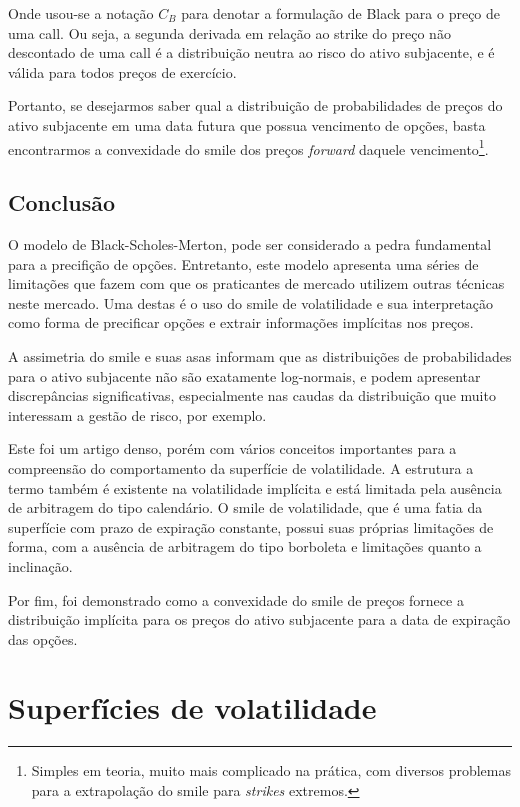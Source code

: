 \documentclass[]{book}
\let\rmarkdownfootnote\footnote%
\def\footnote{\protect\rmarkdownfootnote}
\theoremstyle{definition}
\theoremstyle{definition}
\theoremstyle{definition}
\theoremstyle{remark}
\begin{document}
Onde usou-se a notação \(C_B\) para denotar a formulação de Black para o
preço de uma call. Ou seja, a segunda derivada em relação ao strike do
preço não descontado de uma call é a distribuição neutra ao risco do
ativo subjacente, e é válida para todos preços de exercício.

Portanto, se desejarmos saber qual a distribuição de probabilidades de
preços do ativo subjacente em uma data futura que possua vencimento de
opções, basta encontrarmos a convexidade do smile dos preços
\emph{forward} daquele vencimento\footnote{Simples em teoria, muito mais
  complicado na prática, com diversos problemas para a extrapolação do
  smile para \emph{strikes} extremos.}.

\section{Conclusão}\label{conclusao}

O modelo de Black-Scholes-Merton, pode ser considerado a pedra
fundamental para a precifição de opções. Entretanto, este modelo
apresenta uma séries de limitações que fazem com que os praticantes de
mercado utilizem outras técnicas neste mercado. Uma destas é o uso do
smile de volatilidade e sua interpretação como forma de precificar
opções e extrair informações implícitas nos preços.

A assimetria do smile e suas asas informam que as distribuições de
probabilidades para o ativo subjacente não são exatamente log-normais, e
podem apresentar discrepâncias significativas, especialmente nas caudas
da distribuição que muito interessam a gestão de risco, por exemplo.

Este foi um artigo denso, porém com vários conceitos importantes para a
compreensão do comportamento da superfície de volatilidade. A estrutura
a termo também é existente na volatilidade implícita e está limitada
pela ausência de arbitragem do tipo calendário. O smile de volatilidade,
que é uma fatia da superfície com prazo de expiração constante, possui
suas próprias limitações de forma, com a ausência de arbitragem do tipo
borboleta e limitações quanto a inclinação.

Por fim, foi demonstrado como a convexidade do smile de preços fornece a
distribuição implícita para os preços do ativo subjacente para a data de
expiração das opções.

\hypertarget{superficies}{\chapter{Superfícies de
volatilidade}\label{superficies}}
\end{document}
